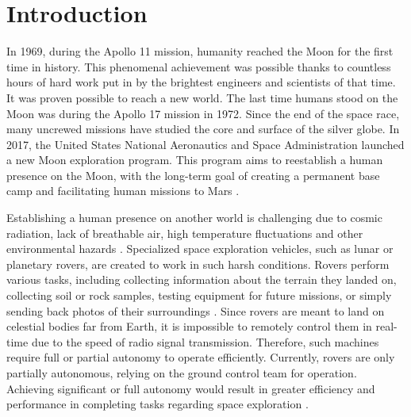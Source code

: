 \documentclass[a4paper,twoside,12pt]{book}
\begin{document}
\cleardoublepage

\pagestyle{PageNumbersChapterTitles}


\chapter{Introduction}
\label{sec:chapter1}
In 1969, during the Apollo 11 mission, humanity reached the Moon for the first time in history. This phenomenal achievement was possible thanks to countless hours of hard work put in by the brightest engineers and scientists of that time. It was proven possible to reach a new world. The last time humans stood on the Moon was during the Apollo 17 mission in 1972. Since the end of the space race, many uncrewed missions have studied the core and surface of the silver globe. In 2017, the United States National Aeronautics and Space Administration launched a new Moon exploration program. This program aims to reestablish a human presence on the Moon, with the long-term goal of creating a permanent base camp and facilitating human missions to Mars \cite{smith2020artemis}.

Establishing a human presence on another world is challenging due to cosmic radiation, lack of breathable air, high temperature fluctuations and other environmental hazards \cite{Yakubovskiy:2019} \cite{latch2008toxicity}. Specialized space exploration vehicles, such as lunar or planetary rovers, are created to work in such harsh conditions. Rovers perform various tasks, including collecting information about the terrain they landed on, collecting soil or rock samples, testing equipment for future missions, or simply sending back photos of their surroundings \cite{bajracharya2008autonomy}.  Since rovers are meant to land on celestial bodies far from Earth, it is impossible to remotely control them in real-time due to the speed of radio signal transmission. Therefore, such machines require full or partial autonomy to operate efficiently. Currently, rovers are only partially autonomous, relying on the ground control team for operation. Achieving significant or full autonomy would result in greater efficiency and performance in completing tasks regarding space exploration \cite{chien2006future}.
\end{document}
